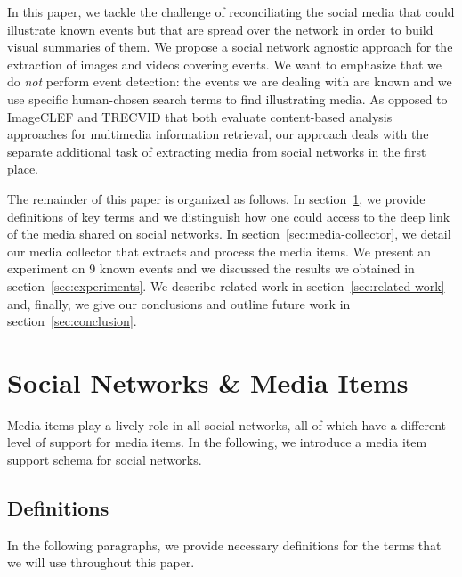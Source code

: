 \documentclass{acm_proc_article-sp}
\let\oldemph\emph
\renewcommand{\emph}[1]{\oldemph{\fontsize{9}{9}\selectfont #1}}
\begin{document}
In this paper, we tackle the challenge of reconciliating the social media that could illustrate known events but that 
are spread over the network in order to build visual summaries of them. We propose a social network agnostic 
approach for the extraction of images and videos covering events. We want to emphasize that we do \emph{not} perform 
event detection: the events we are dealing with are known and we use specific human-chosen search terms to find illustrating 
media. As opposed to \mbox{ImageCLEF} and \mbox{TRECVID} that both evaluate content-based analysis approaches for 
multimedia information retrieval, our approach deals with the separate additional task of extracting media from social networks 
in the first place. 

The remainder of this paper is organized as follows. In section~\ref{sec:social-networks}, we provide definitions of key terms
and we distinguish how one could access to the deep link of the media shared on social networks. In section~\ref{sec:media-collector},
we detail our media collector that extracts and process the media items. We present an experiment on 9 known events and we 
discussed the results we obtained in section~\ref{sec:experiments}. We describe related work in section~\ref{sec:related-work} and, 
finally, we give our conclusions and outline future work in section~\ref{sec:conclusion}.


\section{Social Networks \& Media Items}                                    \label{sec:social-networks}
Media items play a lively role in all social networks,
all of which have a different level of support for media items.
In the following, we introduce a media item support schema for social networks.

\subsection{Definitions}
In the following paragraphs, we provide necessary definitions for the terms that we will use throughout this paper.
\end{document}
